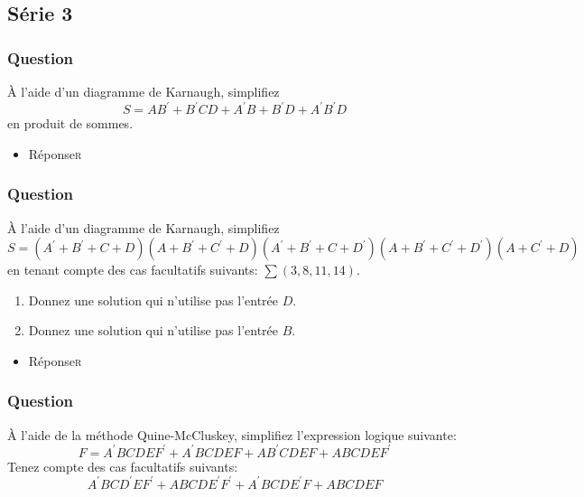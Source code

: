 \documentclass[11pt]{article}
\begin{document}
\subsection*{Série 3}
\label{sec:orgafac288}
\subsubsection*{Question}
\label{sec:orgcd674f0}
À l'aide d'un diagramme de Karnaugh, simplifiez 
  $$
    S = A B^\prime +
    B^\prime CD + A^\prime B + B^\prime D + A^\prime B^\prime D
    $$
  en produit de sommes.

\begin{itemize}
\item Réponse\hfill{}\textsc{r}
\label{sec:org88c7c39}
\end{itemize}

\subsubsection*{Question}
\label{sec:org38a39a3}
À l'aide d'un diagramme de Karnaugh, simplifiez 
  $$
    S = ( A^\prime +
    B^\prime + C + D)(A+B^\prime +C^\prime +D)(A^\prime +B^\prime
    +C+D^\prime )(A+B^\prime +C^\prime +D^\prime )(A+C^\prime +D)
    $$
  en tenant compte des cas facultatifs suivants: \(\sum(3,8,11,14)\).
\begin{enumerate}
\item Donnez une solution qui n'utilise pas l'entrée \(D\).
\item Donnez une solution qui n'utilise pas l'entrée \(B\).
\end{enumerate}

\begin{itemize}
\item Réponse\hfill{}\textsc{r}
\label{sec:orgdef09cc}
\end{itemize}

\subsubsection*{Question}
\label{sec:orge6bf635}
À l'aide de la méthode Quine-McCluskey, simplifiez l'expression
  logique suivante: 
  $$
    F= A^\prime BCDEF^\prime  + A^\prime BCDEF+ AB^\prime CDEF+ ABCDEF^\prime 
    $$
  Tenez compte des cas facultatifs suivants: 
  $$
    A^\prime BCD^\prime EF^\prime +
    ABCDE^\prime F^\prime + A^\prime BCDE^\prime F+ ABCDEF
    $$
\end{document}
